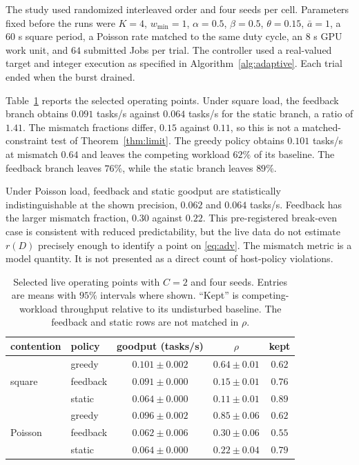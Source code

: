 The study used randomized interleaved order and four seeds per cell. Parameters
fixed before the runs were $K=4$, $w_{\min}=1$, $\alpha=0.5$, $\beta=0.5$,
$\theta=0.15$, $\bar a=1$, a $60$ s square period, a Poisson rate matched to the
same duty cycle, an $8$ s GPU work unit, and $64$ submitted Jobs per trial. The
controller used a real-valued target and integer execution as specified in
Algorithm~\ref{alg:adaptive}. Each trial ended when the burst drained.

Table~\ref{tab:e9} reports the selected operating points. Under square load, the
feedback branch obtains $0.091$ tasks/s against $0.064$ tasks/s for the static
branch, a ratio of $1.41$. The mismatch fractions differ, $0.15$ against $0.11$,
so this is not a matched-constraint test of Theorem~\ref{thm:limit}. The greedy
policy obtains $0.101$ tasks/s at mismatch $0.64$ and leaves the competing
workload $62\%$ of its baseline. The feedback branch leaves $76\%$, while the
static branch leaves $89\%$.

Under Poisson load, feedback and static goodput are statistically
indistinguishable at the shown precision, $0.062$ and $0.064$ tasks/s. Feedback
has the larger mismatch fraction, $0.30$ against $0.22$. This pre-registered
break-even case is consistent with reduced predictability, but the live data do
not estimate $r(D)$ precisely enough to identify a point on
\eqref{eq:adv}. The mismatch metric is a model quantity. It is not presented as
a direct count of host-policy violations.

\begin{table}[t]
\centering
\caption{Selected live operating points with $C=2$ and four seeds. Entries are
means with $95\%$ intervals where shown. ``Kept'' is competing-workload
throughput relative to its undisturbed baseline. The feedback and static rows are
not matched in $\rho$.}
\label{tab:e9}
\small
\setlength{\tabcolsep}{3.5pt}
\begin{tabular}{llccc}
\toprule
contention & policy & goodput (tasks/s) & $\rho$ & kept \\
\midrule
\multirow{3}{*}{square}
 & greedy   & $0.101\pm0.002$ & $0.64\pm0.01$ & $0.62$ \\
 & feedback & $0.091\pm0.000$ & $0.15\pm0.01$ & $0.76$ \\
 & static   & $0.064\pm0.000$ & $0.11\pm0.01$ & $0.89$ \\
\midrule
\multirow{3}{*}{Poisson}
 & greedy   & $0.096\pm0.002$ & $0.85\pm0.06$ & $0.62$ \\
 & feedback & $0.062\pm0.006$ & $0.30\pm0.06$ & $0.55$ \\
 & static   & $0.064\pm0.000$ & $0.22\pm0.04$ & $0.79$ \\
\bottomrule
\end{tabular}
\end{table}

